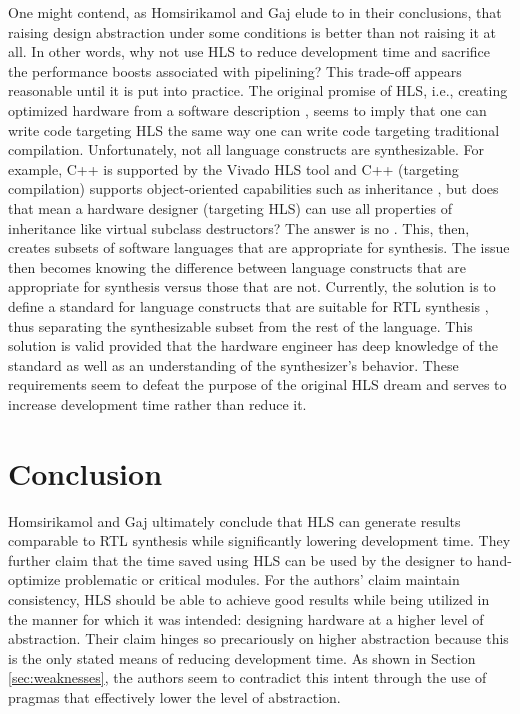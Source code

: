 \documentclass[12pt,journal,compsoc,onecolumn]{IEEEtran}
\begin{document}
One might contend, as Homsirikamol and Gaj elude to in their conclusions, that raising design abstraction under some conditions is better than not raising it at all. In other words, why not use HLS to reduce development time and sacrifice the performance boosts associated with pipelining? This trade-off appears reasonable until it is put into practice. The original promise of HLS, i.e., creating optimized hardware from a software description \cite{3}, seems to imply that one can write code targeting HLS the same way one can write code targeting traditional compilation. Unfortunately, not all language constructs are synthesizable. For example, C++ is supported by the Vivado HLS tool \cite{vivado} and C++ (targeting compilation) supports object-oriented capabilities such as inheritance \cite{c++datamodel}, but does that mean a hardware designer (targeting HLS) can use all properties of inheritance like virtual subclass destructors? The answer is no \cite{c++hls}. This, then, creates subsets of software languages that are appropriate for synthesis. The issue then becomes knowing the difference between language constructs that are appropriate for synthesis versus those that are not. Currently, the solution is to define a standard for language constructs that are suitable for RTL synthesis \cite{ieeeverilog}, thus separating the synthesizable subset from the rest of the language. This solution is valid provided that the hardware engineer has deep knowledge of the standard as well as an understanding of the synthesizer's behavior. These requirements seem to defeat the purpose of the original HLS dream and serves to increase development time rather than reduce it.

\section{Conclusion}
Homsirikamol and Gaj ultimately conclude that HLS can generate results comparable to RTL synthesis while significantly lowering development time. They further claim that the time saved using HLS can be used by the designer to hand-optimize problematic or critical modules. For the authors' claim maintain consistency, HLS should be able to achieve good results while being utilized in the manner for which it was intended: designing hardware at a higher level of abstraction. Their claim hinges so precariously on higher abstraction because this is the only stated means of reducing development time. As shown in Section \ref{sec:weaknesses}, the authors seem to contradict this intent through the use of pragmas that effectively lower the level of abstraction. 
\end{document}

